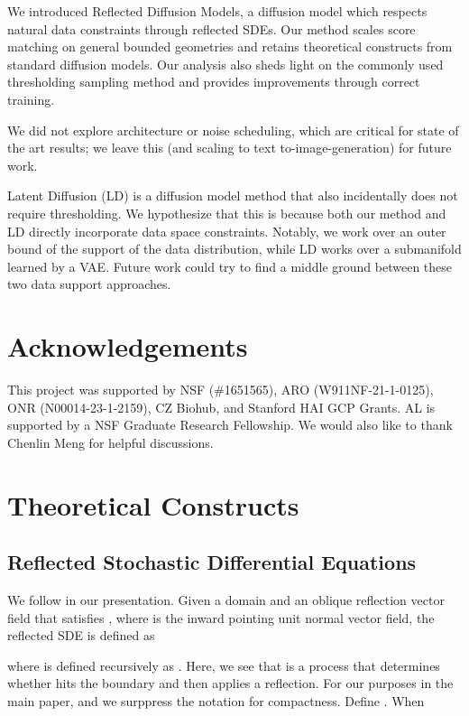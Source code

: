 \documentclass{article}
\theoremstyle{plain}
\theoremstyle{definition}
\theoremstyle{remark}
\begin{document}
We introduced Reflected Diffusion Models, a diffusion model which respects natural data constraints through reflected SDEs. Our method scales score matching on general bounded geometries and retains theoretical constructs from standard diffusion models. Our analysis also sheds light on the commonly used thresholding sampling method and provides improvements through correct training.

We did not explore architecture or noise scheduling, which are critical for state of the art results; we leave this (and scaling to text to-image-generation) for future work.

Latent Diffusion (LD) \citep{Rombach2021HighResolutionIS} is a diffusion model method that also incidentally does not require thresholding. We hypothesize that this is because both our method and LD directly incorporate data space constraints. Notably, we work over an outer bound of the support of the data distribution, while LD works over a submanifold learned by a VAE. Future work could try to find a middle ground between these two data support approaches. \section{Acknowledgements}

This project was supported by NSF (\#1651565), ARO (W911NF-21-1-0125), ONR (N00014-23-1-2159), CZ Biohub, and Stanford HAI GCP Grants. AL is supported by a NSF Graduate Research Fellowship. We would also like to thank Chenlin Meng for helpful discussions.
 




\newpage
\appendix
\onecolumn
\section{Theoretical Constructs}

\subsection{Reflected Stochastic Differential Equations}\label{sec:app:theory:rsde}

We follow \citet{Pilipenko2014AnIT} in our presentation. Given a domain  and an oblique reflection vector field  that satisfies , where  is the inward pointing unit normal vector field, the reflected SDE is defined as

where  is defined recursively as . Here, we see that  is a process that determines whether  hits the boundary and then applies a reflection. For our purposes in the main paper,  and we surppress the notation for compactness.
Define . When
\end{document}
